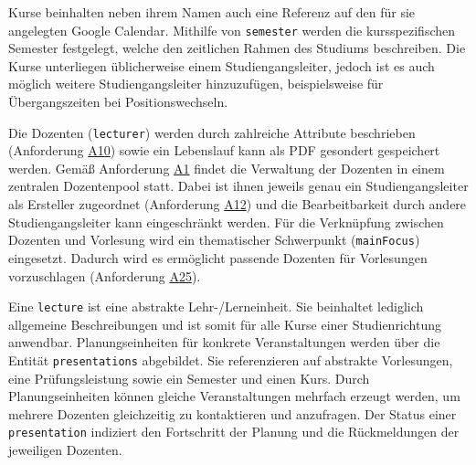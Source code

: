 Kurse beinhalten neben ihrem Namen auch eine Referenz auf den für sie angelegten Google Calendar. 
Mithilfe von \texttt{semester} werden die kursspezifischen Semester festgelegt, welche den zeitlichen Rahmen des Studiums beschreiben.
Die Kurse unterliegen üblicherweise einem Studiengangsleiter, jedoch ist es auch möglich weitere Studiengangsleiter hinzuzufügen, beispielsweise für Übergangszeiten bei Positionswechseln.

Die Dozenten (\texttt{lecturer}) werden durch zahlreiche Attribute beschrieben (Anforderung \hyperref[tab:Anforderungen]{A10}) sowie ein Lebenslauf kann als PDF gesondert gespeichert werden.
Gemäß Anforderung \hyperref[tab:Anforderungen]{A1} findet die Verwaltung der Dozenten in einem zentralen Dozentenpool statt.
Dabei ist ihnen jeweils genau ein Studiengangsleiter als Ersteller zugeordnet (Anforderung \hyperref[tab:Anforderungen]{A12}) und die Bearbeitbarkeit durch andere Studiengangsleiter kann eingeschränkt werden. 
Für die Verknüpfung zwischen Dozenten und Vorlesung wird ein thematischer Schwerpunkt (\texttt{mainFocus}) eingesetzt.
Dadurch wird es ermöglicht passende Dozenten für Vorlesungen vorzuschlagen (Anforderung \hyperref[tab:Anforderungen]{A25}).

Eine \texttt{lecture} ist eine abstrakte Lehr-/Lerneinheit.
Sie beinhaltet lediglich allgemeine Beschreibungen und ist somit für alle Kurse einer Studienrichtung anwendbar. 
Planungseinheiten für konkrete Veranstaltungen werden über die Entität \texttt{presentations} abgebildet.
Sie referenzieren auf abstrakte Vorlesungen, eine Prüfungsleistung sowie ein Semester und einen Kurs. 
Durch Planungseinheiten können gleiche Veranstaltungen mehrfach erzeugt werden, um mehrere Dozenten gleichzeitig zu kontaktieren und anzufragen.
Der Status einer \texttt{presentation} indiziert den Fortschritt der Planung und die Rückmeldungen der jeweiligen Dozenten.
